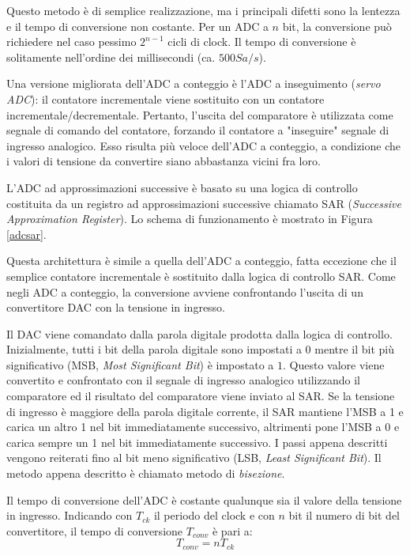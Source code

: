 Questo metodo è di semplice realizzazione, ma i principali difetti sono la lentezza e il tempo di conversione non costante. Per un ADC a $n$ bit, la conversione può richiedere nel caso pessimo $2^{n-1}$ cicli di clock. Il tempo di conversione è solitamente nell'ordine dei millisecondi (ca. $500 Sa/s$).

Una versione migliorata dell'ADC a conteggio è l'ADC a inseguimento (\textit{servo ADC}): il contatore incrementale viene sostituito con un contatore incrementale/decrementale. Pertanto, l'uscita del comparatore è utilizzata come segnale di comando del contatore, forzando il contatore a "inseguire" segnale di ingresso analogico. Esso risulta più veloce dell'ADC a conteggio, a condizione che i valori di tensione da convertire siano abbastanza vicini fra loro.

L'ADC ad approssimazioni successive è basato su una logica di controllo costituita da un registro ad approssimazioni successive chiamato SAR (\textit{Successive Approximation Register}). Lo schema di funzionamento è mostrato in Figura \ref{adcsar}.

Questa architettura è simile a quella dell'ADC a conteggio, fatta eccezione che il semplice contatore incrementale è sostituito dalla logica di controllo SAR. Come negli ADC a conteggio, la conversione avviene confrontando l'uscita di un convertitore DAC con la tensione in ingresso.

Il DAC viene comandato dalla parola digitale prodotta dalla logica di controllo. Inizialmente, tutti i bit della parola digitale sono impostati a 0 mentre il bit più significativo (MSB, \textit{Most Significant Bit}) è impostato a $1$. Questo valore viene convertito e confrontato con il segnale di ingresso analogico utilizzando il comparatore ed il risultato del comparatore viene inviato al SAR. Se la tensione di ingresso è maggiore della parola digitale corrente, il SAR mantiene l'MSB a 1 e carica un altro 1 nel bit immediatamente successivo, altrimenti pone l'MSB a 0 e carica sempre un 1 nel bit immediatamente successivo. I passi appena descritti vengono reiterati fino al bit meno significativo (LSB, \textit{Least Significant Bit}). Il metodo appena descritto è chiamato metodo di \textit{bisezione}.

Il tempo di conversione dell'ADC è costante qualunque sia il valore della tensione in ingresso. Indicando con $T_{ck}$ il periodo del clock e con $n$ bit il numero di bit del convertitore, il tempo di conversione $T_{conv}$ è pari a:
\begin{equation}
	T_{conv}=nT_{ck}
\end{equation}

